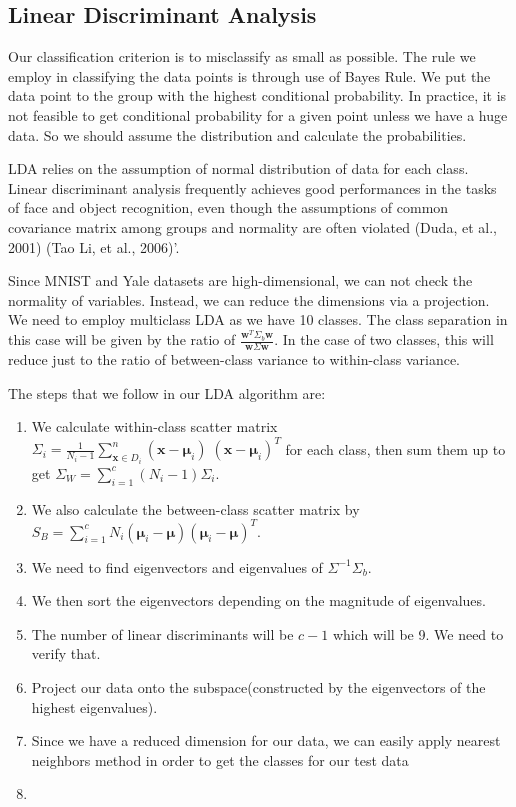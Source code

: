 \subsection{Linear Discriminant Analysis}

Our classification criterion is to misclassify as small as possible. The rule we employ in classifying the data points is through use of Bayes Rule. We put the data point to the group with the highest conditional probability. In practice, it is not feasible to get conditional probability for a given point unless we have a huge data. So we should assume the distribution and calculate the probabilities. 

LDA relies on the assumption of normal distribution of data for each class. Linear discriminant analysis frequently achieves good performances in the tasks of face and object recognition, even though the assumptions of common covariance matrix among groups and normality are often violated (Duda, et al., 2001) (Tao Li, et al., 2006)'.

Since MNIST and Yale datasets are high-dimensional, we can not check the normality of variables. Instead, we can reduce the dimensions via a projection.
We need to employ multiclass LDA as we have 10 classes. The class separation in this case will be given by the ratio of $\frac{\pmb w^T \Sigma_b \pmb w}{\pmb w \Sigma \pmb w}$. In the case of two classes, this will reduce just to the ratio of between-class variance to within-class variance.

The steps that we follow in our LDA algorithm are: 
\begin{enumerate}
	\item We calculate within-class scatter matrix $\Sigma_i = \frac{1}{N_{i}-1} \sum\limits_{\pmb x \in D_i}^n (\pmb x - \pmb \mu_i)\;(\pmb x - \pmb \mu_i)^T$ for each class, then sum them up to get $\Sigma_W = \sum\limits_{i =1}^{c} (N_i - 1) \Sigma_i  $.
	\item We also calculate the between-class scatter matrix by $S_B = \sum\limits_{i =1}^c N_i (\pmb \mu_i - \pmb \mu) (\pmb \mu_i - \pmb \mu)^T$.
	\item We need to find eigenvectors and eigenvalues of $\Sigma^{-1} \Sigma_b$.
	\item We then sort the eigenvectors depending on the magnitude of eigenvalues.
	\item The number of linear discriminants will be $c-1$ which will be 9. We need to verify that.
	\item Project our data onto the subspace(constructed by the eigenvectors of the highest eigenvalues).
	\item Since we have a reduced dimension for our data, we can easily apply nearest neighbors method in order to get the classes for our test data
	\item 
\end{enumerate}

